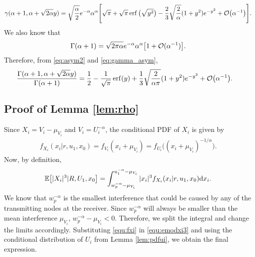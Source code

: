 \documentclass[journal,draftclsnofoot,onecolumn,12pt]{IEEEtran}
\begin{document}
\begin{align}\label{eq:asym2}
\gamma(\alpha+1,\alpha+\sqrt{2\alpha}y)  = \sqrt{\frac{\alpha}{2}} e^{-\alpha} \alpha^{\alpha} \Bigg[ \sqrt{\pi} + \sqrt{\pi}\operatorname{erf}\big(\sqrt{y^2}\big)-\frac{2}{3}\sqrt{\frac{2}{\alpha}}(1+y^2)e^{-y^2} + {\mathcal{O}}\big(\alpha^{-1}\big) \Bigg].
\end{align}
We also know that~\cite{stirling} 
\begin{align}\label{eq:gamma_asym}
\Gamma(\alpha+1) = \sqrt{2\pi\alpha}e^{-\alpha}\alpha^{\alpha} \big[1 + {\mathcal{O}}(\alpha^{-1})\big].
\end{align}
Therefore, from \eqref{eq:asym2} and \eqref{eq:gamma_asym},
\begin{align}
\frac{\Gamma(\alpha+1, \alpha+\sqrt{2\alpha}y)}{\Gamma(\alpha +1)} &= \frac{1}{2} - \frac{1}{\sqrt{\pi}}\operatorname{erf}(y) + \frac{1}{3}\sqrt{\frac{2}{\alpha\pi}}(1+y^2)e^{-y^2} + {\mathcal{O}}\big(\alpha^{-1}\big).
\end{align}

\subsection{Proof of Lemma \ref{lem:rho}}\label{app:rho}
Since $X_i = V_i - \mu_{V_i}$ and $V_i = U_i^{-\alpha}$, the conditional PDF of $X_i$ is given by
\begin{align}\label{equ:fxi}
f_{X_i}(x_i | r, u_1, x_0) = f_{V_i}(x_i + \mu_{V_i}) = f_{U_i}\big( (x_i + \mu_{V_i})^{-1/\alpha} \big). 
\end{align} 
Now, by definition,
\begin{align}\label{equ:emodxi3}
{\mathbb{E}} \big[ |X_i|^3 | R, U_1, x_0 \big] = \int_{w_p^{-\alpha}-\mu_{V_i}}^{u_1^{-\alpha} - \mu_{V_i}} |x_i|^3 f_{X_i}(x_i|r,u_1,x_0) {\rm d}x_i.
\end{align}
We know that $w_p^{-\alpha}$ is the smallest interference that could be caused by any of the transmitting nodes at the receiver. Since $w_p^{-\alpha}$ will always be smaller than the mean interference $\mu_{V_i}$, $w_p^{-\alpha} - \mu_{V_i}<0$. Therefore, we split the integral and change the limits accordingly. Substituting \eqref{equ:fxi} in \eqref{equ:emodxi3} and using the conditional distribution of $U_i$ from Lemma \ref{lem:pdfui}, we obtain the final expression.
\end{document}
